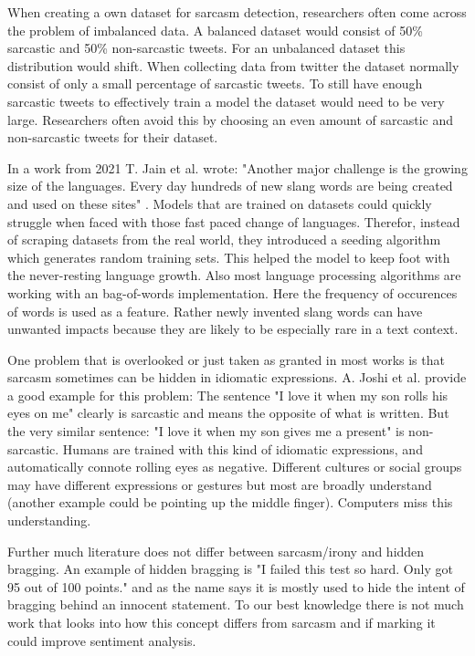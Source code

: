 \documentclass[sigconf,  review=false, nonacm=true]{acmart}
\begin{document}
When creating a own dataset for sarcasm detection, researchers often come across the problem of imbalanced data. A balanced dataset would consist of 50\% sarcastic and 50\% non-sarcastic tweets. For an unbalanced dataset this distribution would shift. When collecting data from twitter the dataset normally consist of only a small percentage of sarcastic tweets. To still have enough sarcastic tweets to effectively train a model the dataset would need to be very large. Researchers often avoid this by choosing an even amount of sarcastic and non-sarcastic tweets for their dataset.


In a work from 2021 T. Jain et al. wrote: "Another major challenge is the growing size of the languages. Every day hundreds of new slang words are being created and used on these sites" \cite{Sarcasm_detection_of_tweets}. Models that are trained on datasets could quickly struggle when faced with those fast paced change of languages. Therefor, instead of scraping datasets from the real world, they introduced a seeding algorithm which generates random training sets. This helped the model to keep foot with the never-resting language growth.
Also most language processing algorithms are working with an bag-of-words implementation. Here the frequency of occurences of words is used as a feature. Rather newly invented slang words can have unwanted impacts because they are likely to be especially rare in a text context.

One problem that is overlooked or just taken as granted in most works is that sarcasm sometimes can be hidden in idiomatic expressions. A. Joshi et al. \cite{Automatic_Sarcasm_Detection} provide a good example for this problem: The sentence "I love it when my son rolls his eyes on me" clearly is sarcastic and means the opposite of what is written. But the very similar sentence: "I love it when my son gives me a present" is non-sarcastic. Humans are trained with this kind of idiomatic expressions, and automatically connote rolling eyes as negative. Different cultures or social groups may have different expressions or gestures but most are broadly understand (another example could be pointing up the middle finger). Computers miss this understanding.

Further much literature does not differ between sarcasm/irony and hidden bragging. An example of hidden bragging is "I failed this test so hard. Only got 95 out of 100 points." and as the name says it is mostly used to hide the intent of bragging behind an innocent statement. To our best knowledge there is not much work that looks into how this concept differs from sarcasm and if marking it could improve sentiment analysis.
\end{document}
